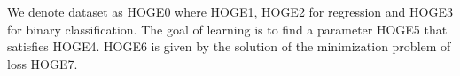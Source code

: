             We denote dataset as HOGE0
            where HOGE1, HOGE2 for regression and HOGE3 for binary classification.
            The goal of learning is to find a parameter HOGE5 that satisfies HOGE4.
            HOGE6 is given by the solution of the minimization problem of loss HOGE7.
